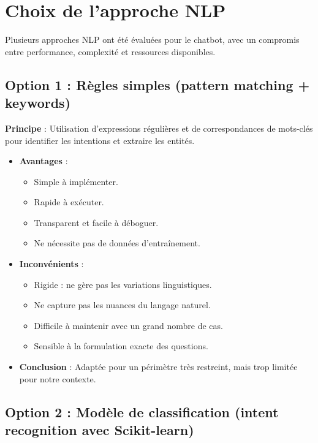 \section{Choix de l'approche NLP}
\label{sec:sprint6-nlp-approach}

Plusieurs approches NLP ont été évaluées pour le chatbot, avec un compromis entre performance, complexité et ressources disponibles.

\subsection{Option 1 : Règles simples (pattern matching + keywords)}
\label{subsec:nlp-rules}

\textbf{Principe} : Utilisation d'expressions régulières et de correspondances de mots-clés pour identifier les intentions et extraire les entités.

\begin{itemize}
    \item \textbf{Avantages} :
        \begin{itemize}
            \item Simple à implémenter.
            \item Rapide à exécuter.
            \item Transparent et facile à déboguer.
            \item Ne nécessite pas de données d'entraînement.
        \end{itemize}
    \item \textbf{Inconvénients} :
        \begin{itemize}
            \item Rigide : ne gère pas les variations linguistiques.
            \item Ne capture pas les nuances du langage naturel.
            \item Difficile à maintenir avec un grand nombre de cas.
            \item Sensible à la formulation exacte des questions.
        \end{itemize}
    \item \textbf{Conclusion} : Adaptée pour un périmètre très restreint, mais trop limitée pour notre contexte.
\end{itemize}

\subsection{Option 2 : Modèle de classification (intent recognition avec Scikit-learn)}
\label{subsec:nlp-classification}

